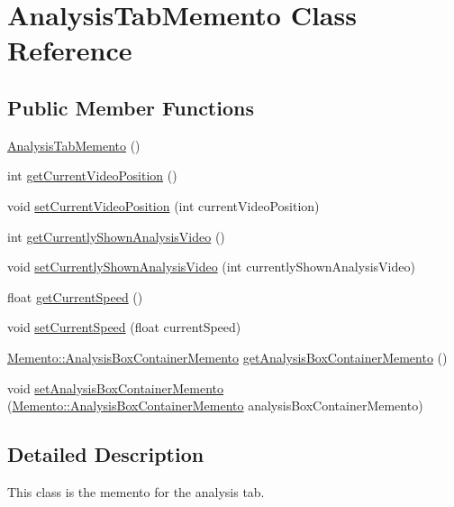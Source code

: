 \hypertarget{classMemento_1_1AnalysisTabMemento}{}\section{Analysis\+Tab\+Memento Class Reference}
\label{classMemento_1_1AnalysisTabMemento}
\subsection*{Public Member Functions}
\begin{DoxyCompactItemize}
\item 
\hyperlink{classMemento_1_1AnalysisTabMemento_a035f84d6066cdb7d8a475da4710d2e67}{Analysis\+Tab\+Memento} ()
\item 
int \hyperlink{classMemento_1_1AnalysisTabMemento_af7babc742dcea9250c73c408b2cfacf2}{get\+Current\+Video\+Position} ()
\item 
void \hyperlink{classMemento_1_1AnalysisTabMemento_a66ff926aa567b15381b5906cd65c6b7d}{set\+Current\+Video\+Position} (int current\+Video\+Position)
\item 
int \hyperlink{classMemento_1_1AnalysisTabMemento_a687a0fc92408cf713058eaf23abc22f3}{get\+Currently\+Shown\+Analysis\+Video} ()
\item 
void \hyperlink{classMemento_1_1AnalysisTabMemento_a1d76537f6e47c09e47bf15eefd26feff}{set\+Currently\+Shown\+Analysis\+Video} (int currently\+Shown\+Analysis\+Video)
\item 
float \hyperlink{classMemento_1_1AnalysisTabMemento_a4c7df241ee5989199664bfc3b336d228}{get\+Current\+Speed} ()
\item 
void \hyperlink{classMemento_1_1AnalysisTabMemento_aa99f3e18fe8363d1333c1ddedfa12084}{set\+Current\+Speed} (float current\+Speed)
\item 
\hyperlink{classMemento_1_1AnalysisBoxContainerMemento}{Memento\+::\+Analysis\+Box\+Container\+Memento} \hyperlink{classMemento_1_1AnalysisTabMemento_a1882d53a845bc483ee4974f633026043}{get\+Analysis\+Box\+Container\+Memento} ()
\item 
void \hyperlink{classMemento_1_1AnalysisTabMemento_aca56db151b2ff66e743215ac8bc5b942}{set\+Analysis\+Box\+Container\+Memento} (\hyperlink{classMemento_1_1AnalysisBoxContainerMemento}{Memento\+::\+Analysis\+Box\+Container\+Memento} analysis\+Box\+Container\+Memento)
\end{DoxyCompactItemize}


\subsection{Detailed Description}
This class is the memento for the analysis tab. 


